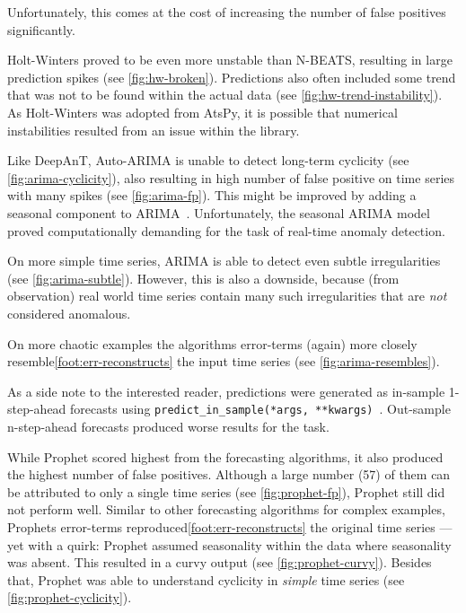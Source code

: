 \begin{description}[style=unboxed,leftmargin=0cm]
    Unfortunately, this comes at the cost of increasing the number of false positives
    significantly.
    \item[Holt-Winters] Holt-Winters proved to be even more unstable than N-BEATS,
    resulting in large prediction spikes (see \cref{fig:hw-broken}). Predictions also
    often included some trend that was not to be found within the actual data (see
    \cref{fig:hw-trend-instability}). As Holt-Winters was adopted from AtsPy,
    it is possible that numerical instabilities resulted from an issue within the library.
    \item[Auto-ARIMA] Like DeepAnT, Auto-ARIMA is unable to detect long-term
    cyclicity (see \cref{fig:arima-cyclicity}), also resulting in high number of
    false positive on time series with many spikes (see \cref{fig:arima-fp}).
    This might be improved by adding a seasonal component to ARIMA~\cite[cf.][]{Box.2016}.
    Unfortunately, the seasonal ARIMA model proved computationally demanding for
    the task of real-time anomaly detection.

    On more simple time series, ARIMA is able to detect even subtle irregularities
    (see \cref{fig:arima-subtle}). However, this is also a downside, because
    (from observation) real world time series contain many such irregularities
    that are \textit{not} considered anomalous.
    
    On more chaotic examples the algorithms error-terms (again) more closely
    resemble\cref{foot:err-reconstructs} the input time series (see \cref{fig:arima-resembles}).
    
    As a side note to the interested reader, predictions were generated as in-sample
    1-step-ahead forecasts using \mbox{\texttt{predict\_in\_sample(*args, **kwargs)}~\cite{Smith.2017}}.
    Out-sample n-step-ahead forecasts produced worse results for the task.
    \item[Prophet] While Prophet scored highest from the forecasting algorithms,
    it also produced the highest number of false positives. Although a large number
    (57) of them can be attributed to only a single time series (see \cref{fig:prophet-fp}),
    Prophet still did not perform well. Similar to other forecasting algorithms
    for complex examples, Prophets error-terms reproduced\cref{foot:err-reconstructs}
    the original time series --- yet with a quirk: Prophet assumed seasonality within
    the data where seasonality was absent. This resulted in a curvy output
    (see \cref{fig:prophet-curvy}). Besides that, Prophet was able to understand
    cyclicity in \textit{simple} time series (see \cref{fig:prophet-cyclicity}).
\end{description}
